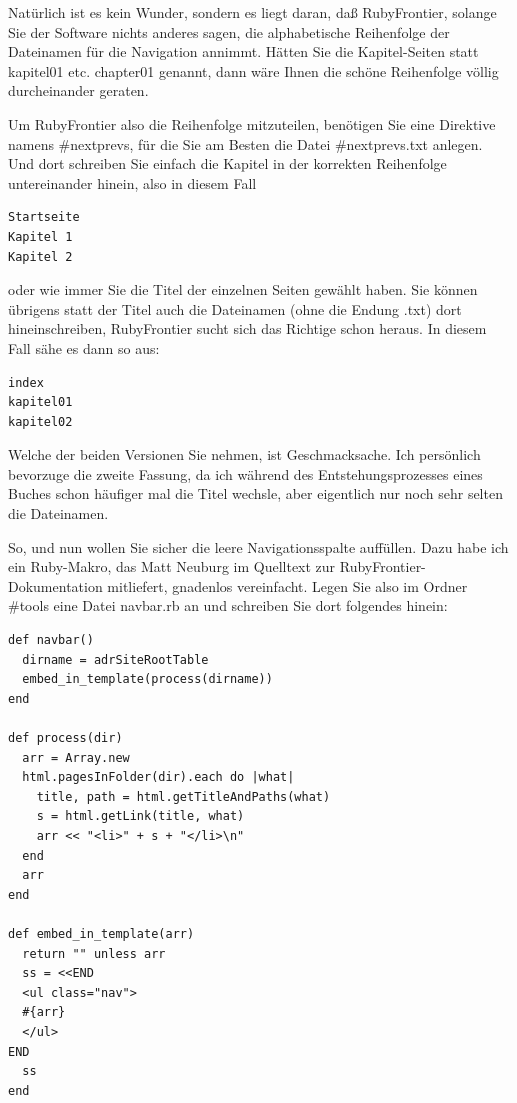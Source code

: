 \documentclass[11pt]{report}
\begin{document}
Natürlich ist es kein Wunder, sondern es liegt daran, daß
RubyFrontier, solange Sie der Software nichts anderes sagen, die
alphabetische Reihenfolge der Dateinamen für die Navigation
annimmt. Hätten Sie die Kapitel-Seiten statt kapitel01 etc. chapter01
genannt, dann wäre Ihnen die schöne Reihenfolge völlig durcheinander
geraten.


Um RubyFrontier also die Reihenfolge mitzuteilen, benötigen Sie eine
Direktive namens \#nextprevs, für die Sie am Besten die
Datei \#nextprevs.txt anlegen. Und dort schreiben Sie einfach die
Kapitel in der korrekten Reihenfolge untereinander hinein, also in
diesem Fall


\begin{verbatim}
Startseite
Kapitel 1
Kapitel 2
\end{verbatim}

oder wie immer Sie die Titel der einzelnen Seiten gewählt haben. Sie
können übrigens statt der Titel auch die Dateinamen (ohne die Endung
.txt) dort hineinschreiben, RubyFrontier sucht sich das Richtige schon
heraus. In diesem Fall sähe es dann so aus:


\begin{verbatim}
index
kapitel01
kapitel02
\end{verbatim}

Welche der beiden Versionen Sie nehmen, ist Geschmacksache. Ich
persönlich bevorzuge die zweite Fassung, da ich während des
Entstehungsprozesses eines Buches schon häufiger mal die Titel
wechsle, aber eigentlich nur noch sehr selten die Dateinamen.


So, und nun wollen Sie sicher die leere Navigationsspalte
auffüllen. Dazu habe ich ein Ruby-Makro, das Matt Neuburg im Quelltext
zur RubyFrontier-Dokumentation mitliefert, gnadenlos
vereinfacht. Legen Sie also im Ordner \#tools eine Datei navbar.rb an
und schreiben Sie dort folgendes hinein:


\begin{verbatim}
def navbar()
  dirname = adrSiteRootTable
  embed_in_template(process(dirname))
end

def process(dir)
  arr = Array.new
  html.pagesInFolder(dir).each do |what|
    title, path = html.getTitleAndPaths(what)
    s = html.getLink(title, what)
    arr << "<li>" + s + "</li>\n"
  end
  arr
end

def embed_in_template(arr)
  return "" unless arr
  ss = <<END
  <ul class="nav">
  #{arr}
  </ul>
END
  ss
end
\end{verbatim}
\end{document}
